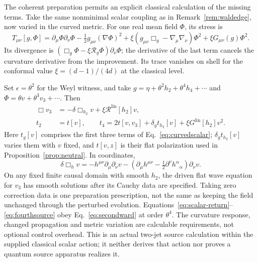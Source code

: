 \documentclass[12pt]{article}
\theoremstyle{definition}
\theoremstyle{remark}
\newcommand{\Glin}{G^{\mathrm{lin}}}
\begin{document}
The coherent preparation permits an explicit classical calculation of
the missing terms. Take the same nonminimal scalar coupling as in
Remark~\ref{rem:waldedge}, now varied in the curved metric. For one real
mean field $\Phi$, its stress is
\begin{equation}
 T_{\mu\nu}[g,\Phi]=\partial_\mu\Phi\partial_\nu\Phi
 -\tfrac12g_{\mu\nu}(\nabla\Phi)^2
 +\xi(g_{\mu\nu}\Box_g-\nabla_\mu\nabla_\nu)\Phi^2
 +\xi G_{\mu\nu}(g)\Phi^2.
 \label{eq:curvedscalar}
\end{equation}
Its divergence is $(\Box_g\Phi-\xi\mathcal R_g\Phi)\partial_\nu\Phi$;
the derivative of the last term cancels the curvature derivative from
the improvement. Its trace vanishes on shell for the conformal value
$\xi=(d-1)/(4d)$ at the classical level.

Set $\epsilon=\theta^2$ for the Weyl witness, and take
$g=\eta+\theta^2h_2+\theta^4h_4+\cdots$ and
$\Phi=\theta v+\theta^3v_3+\cdots$. Then
\begin{align}
 \Box v_3&=-\delta\Box_{h_2}v+\xi\mathcal R^{\mathrm{lin}}[h_2]v,
 \label{eq:scalar-return}\\
 t_2&=t[v],\qquad
 t_4=2t[v,v_3]+\delta_g t_{h_2}[v]
                       +\xi\Glin[h_2]v^2.\label{eq:fourthsource}
\end{align}
Here $t_g[v]$ comprises the first three terms of
Eq.~\eqref{eq:curvedscalar}; $\delta_g t_{h_2}[v]$ varies them with $v$
fixed, and $t[v,z]$ is their flat polarization used in
Proposition~\ref{prop:neutral}. In coordinates,
\[
 \delta\Box_h v=-h^{\mu\nu}\partial_\mu\partial_\nu v
 -(\partial_\mu h^{\mu\nu}-\tfrac12\partial^\nu h^\alpha{}_{\alpha})
                                                  \partial_\nu v.
\]
On any fixed finite causal domain with smooth $h_2$, the driven flat
wave equation for $v_3$ has smooth solutions after its Cauchy data are
specified. Taking zero correction data is one preparation prescription,
not the same as keeping the field unchanged through the perturbed evolution.
Equations~\eqref{eq:scalar-return}--\eqref{eq:fourthsource} obey
Eq.~\eqref{eq:secondward} at order $\theta^4$. The curvature response,
changed propagation and metric variation are calculable requirements,
not optional control overhead. This is an actual two-jet source
calculation within the supplied classical scalar action; it neither
derives that action nor proves a quantum source apparatus realizes it.
\end{document}
